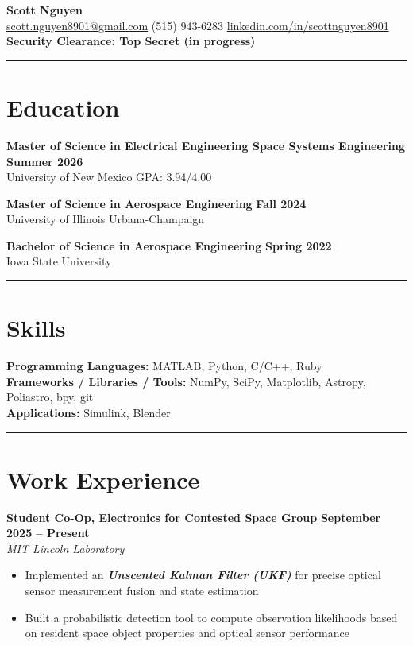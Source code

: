 \documentclass[10pt]{article}
\newcommand{\sectionline}{\noindent\rule{\linewidth}{0.4pt}}
\begin{document}
	
	\begin{center}
		{\color{mygreen}
			{\Huge \textbf{Scott Nguyen}} \\
			\small
			\href{mailto:scott.nguyen8901@gmail.com}{scott.nguyen8901@gmail.com} \textbar
			(515) 943-6283 \textbar
			\href{https://www.linkedin.com/in/scottnguyen8901/}{linkedin.com/in/scottnguyen8901} \textbar
			\textbf{Security Clearance: Top Secret (in progress)}
		}
	\end{center}

	\sectionline
	
	\section*{Education}
	
	\textbf{Master of Science in Electrical Engineering \textbar Space Systems Engineering} \hfill \textbf{Summer 2026} \\
	University of New Mexico \hfill GPA: 3.94/4.00
	
	\textbf{Master of Science in Aerospace Engineering} \hfill \textbf{Fall 2024} \\
	University of Illinois Urbana-Champaign
	
	\textbf{Bachelor of Science in Aerospace Engineering} \hfill \textbf{Spring 2022} \\
	Iowa State University
	
	\sectionline
	
	\section*{Skills}
	\textbf{Programming Languages:} MATLAB, Python, C/C++, Ruby \\
	\textbf{Frameworks / Libraries / Tools:} NumPy, SciPy, Matplotlib, Astropy, Poliastro, bpy, git \\
	\textbf{Applications:} Simulink, Blender
	
	\sectionline
	
	\section*{Work Experience}

	\textbf{Student Co-Op, Electronics for Contested Space Group} \hfill \textbf{September 2025 – Present} \\
	\emph{MIT Lincoln Laboratory}
	\begin{itemize}
		\item Implemented an \textbf{\emph{Unscented Kalman Filter (UKF)}} for precise optical sensor measurement fusion and state estimation
		\item Built a probabilistic detection tool to compute observation likelihoods based on resident space object properties and optical sensor performance
	\end{itemize}
\end{document}
